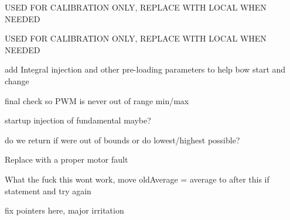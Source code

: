 
\begin{DoxyRefList}
\item[Member \mbox{\hyperlink{struct__calibrationData_a7359cc201af09ef84f616f19bf21a82b}{\+\_\+calibration\+Data\+::max\+Speed\+PWM}} ]\label{todo__todo000010}%
%
USED FOR CALIBRATION ONLY, REPLACE WITH LOCAL WHEN NEEDED  
\item[Member \mbox{\hyperlink{struct__calibrationData_a703fec13dcf0d8cf024236c6c97ca84f}{\+\_\+calibration\+Data\+::min\+Speed\+PWM}} ]\label{todo__todo000009}%
%
USED FOR CALIBRATION ONLY, REPLACE WITH LOCAL WHEN NEEDED  
\item[Member \mbox{\hyperlink{classbowControl_a51d03db7ff6ba45e3643b3cfb047c081}{bow\+Control\+::pid\+Control}} ()]\label{todo__todo000002}%
%
add Integral injection and other pre-\/loading parameters to help bow start and change 

final check so PWM is never out of range min/max 

startup injection of fundamental maybe?  
\item[Member \mbox{\hyperlink{classbowControl_af3c67773447df63befb6af1bfc978e03}{bow\+Control\+::set\+Harmonic}} (int \+\_\+harmonic)]\label{todo__todo000003}%
%
do we return if we\textquotesingle{}re out of bounds or do lowest/highest possible?  
\item[Member \mbox{\hyperlink{classbowControl_ac763e2c7400be2248ffad2e13462d60a}{bow\+Control\+::update\+String}} ()]\label{todo__todo000004}%
%
Replace with a proper motor fault  
\item[Member \mbox{\hyperlink{classbowIO_a4f7ef490b19cc4d9d6e3bd2e65d77061}{bow\+IO\+::average\+Freq}} ()]\label{todo__todo000005}%
%
What the fuck this wont work, move old\+Average = average to after this if statement and try again  
\item[Member \mbox{\hyperlink{classstringModule_a52a5b213e054d030023de05b46769555}{string\+Module\+::add\+Bow}} (char motor\+Rev\+Pin, char motor\+Voltage\+Pin, char motor\+DCDCEn, char tacho\+Pin, char current\+Sense\+Pin, char motor\+Fault\+Pin, char step\+En\+Pin, char step\+Dir\+Pin, char step\+Step\+Pin, Hardware\+Serial $\ast$step\+Serial\+Port, char step\+Home\+Sensor\+Pin, char step\+Correction\+Sensor\+Pin)]\label{todo__todo000008}%
%
fix pointers here, major irritation 
\end{DoxyRefList}